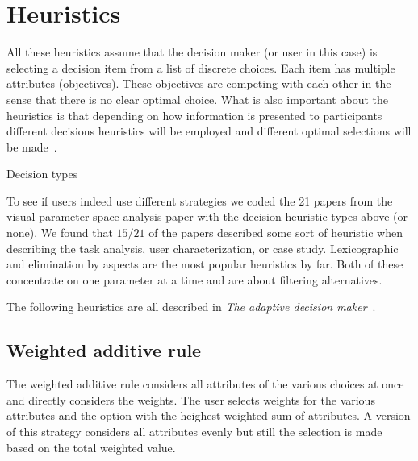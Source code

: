 
\section{Heuristics}\label{heuristics}

All these heuristics assume that the decision maker (or user in this case)
is selecting a decision item from a list of discrete choices. Each item
has multiple attributes (objectives). These objectives are competing with
each other in the sense that there is no clear optimal choice. What is also
important about the heuristics is that depending on how information is 
presented to participants different decisions heuristics will be employed
and different optimal selections will be made~\citep{Jarvenpaa:1990}.

\begin{table*}[tb]
  \begin{center}
    \caption{Decision types}
  \end{center}
\end{table*}

To see if users indeed use different strategies we coded the 21 papers from the
visual parameter space analysis paper \citep{Sedlmair:2014} with the decision
heuristic types above (or none). We found that $15/21$ of the papers described
some sort of heuristic when describing the task analysis, user
characterization, or case study.
Lexicographic and elimination by aspects are the most popular heuristics
by far. Both of these concentrate on one parameter at a time and are
about filtering alternatives. 

The following heuristics are all described in \emph{The adaptive decision
maker}~\citep{Payne:1993}.


\subsection{Weighted additive rule}\label{weighted-additive-rule}

The weighted additive rule considers all
attributes of the various choices at once and directly considers 
the weights. The user selects weights for the various attributes and 
the option with the heighest weighted sum of attributes.
A version of this strategy considers all attributes evenly but still
the selection is made based on the total weighted value.

